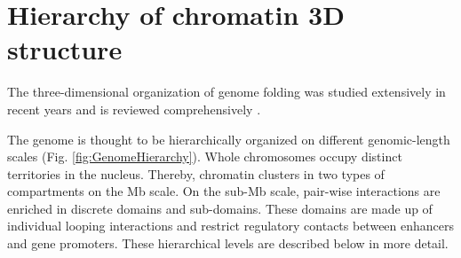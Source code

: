 \documentclass[a4paper,twoside=true,openright,parskip=full,chapterprefix=true,11pt,headings=normal,bibliography=totoc,listof=totoc,titlepage=on,captions=tableabove,draft=false]{scrreprt}
\theoremstyle{definition}
\theoremstyle{definition}
\theoremstyle{definition}
\theoremstyle{remark}
\begin{document}
\hypertarget{hierarchy-of-chromatin-3d-structure}{%
\section{Hierarchy of chromatin 3D
structure}\label{hierarchy-of-chromatin-3d-structure}}

The three-dimensional organization of genome folding was studied
extensively in recent years and is reviewed comprehensively
\citep{Pombo2015, Sexton2015, Bouwman2015, Dekker2016, Dixon2016, Schmitt2016, Bonev2016, Hnisz2016a, Merkenschlager2016, Long2016, Rowley2016, Ruiz-Velasco2017, Andrey2017}.

The genome is thought to be hierarchically organized on different
genomic-length scales (Fig. \ref{fig:GenomeHierarchy}). Whole
chromosomes occupy distinct territories in the nucleus. Thereby,
chromatin clusters in two types of compartments on the Mb scale. On the
sub-Mb scale, pair-wise interactions are enriched in discrete domains
and sub-domains. These domains are made up of individual looping
interactions and restrict regulatory contacts between enhancers and gene
promoters. These hierarchical levels are described below in more detail.
\end{document}
